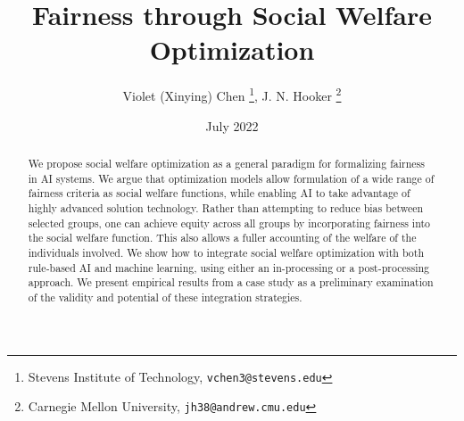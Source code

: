 \documentclass{article}[11pt]
\title{Fairness through Social Welfare Optimization}
\author{Violet (Xinying) Chen \thanks{Stevens Institute of Technology, \texttt{vchen3@stevens.edu}}, J. N. Hooker \thanks{Carnegie Mellon University, \texttt{jh38@andrew.cmu.edu}}}
\date{July 2022}
\begin{document}
\maketitle

\begin{abstract}
We propose social welfare optimization as a general paradigm for formalizing fairness in AI systems. We argue that optimization models allow formulation of a wide range of fairness criteria as social welfare functions, while enabling AI to take advantage of highly advanced solution technology. Rather than attempting to reduce bias between selected groups, one can achieve equity across all groups by incorporating fairness into the social welfare function.  This also allows a fuller accounting of the welfare of the individuals involved.  We show how to integrate social welfare optimization with both rule-based AI and machine learning, using either an  in-processing or a post-processing approach. 
We present empirical results from a case study as a preliminary examination of the validity and potential of these integration strategies. 
\end{abstract}
\end{document}
